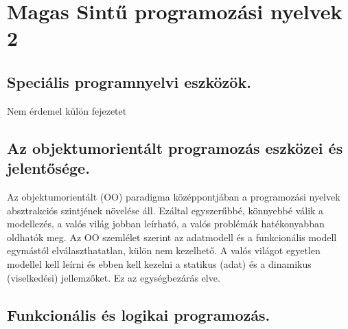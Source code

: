 \section{Magas Sintű programozási nyelvek 2}
\subsection{Speciális programnyelvi eszközök.}
Nem érdemel külön fejezetet

\subsection{Az objektumorientált programozás eszközei és jelentősége.}
Az objektumorientált (OO) paradigma középpontjában a programozási nyelvek absztrakciós szintjének növelése
áll. Ezáltal egyszerűbbé, könnyebbé válik a modellezés, a valós világ jobban leírható, a valós problémák
hatékonyabban oldhatók meg. Az OO szemlélet szerint az adatmodell és a funkcionális modell egymástól
elválaszthatatlan, külön nem kezelhető. A valós világot egyetlen modellel kell leírni és ebben kell kezelni a
statikus (adat) és a dinamikus (viselkedési) jellemzőket. Ez az egységbezárás elve.

\subsection{Funkcionális és logikai programozás.}
